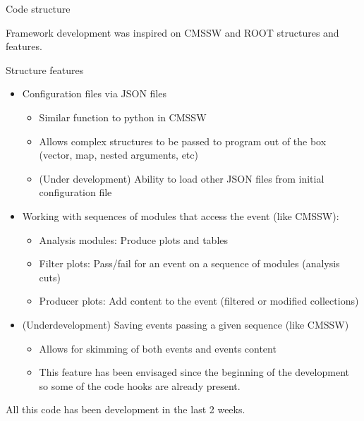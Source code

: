 \documentclass[8pt]{beamer}
\begin{document}
\begin{frame}{Code structure}
 
Framework development was inspired on CMSSW and ROOT structures and features.
 
\begin{block}{Structure features}

\begin{itemize}
  \item Configuration files via JSON files
  \begin{itemize}
    \item Similar function to python in CMSSW
    \item Allows complex structures to be passed to program out of the box (vector, map, nested arguments, etc)
    \item (Under development) Ability to load other JSON files from initial configuration file 
  \end{itemize}
  \item Working with sequences of modules that access the event (like CMSSW):
  \begin{itemize}
    \item Analysis modules: Produce plots and tables
    \item Filter plots: Pass/fail for an event on a sequence of modules (analysis cuts)
    \item Producer plots: Add content to the event (filtered or modified collections)
  \end{itemize}
  \item (Underdevelopment) Saving events passing a given sequence (like CMSSW)
  \begin{itemize}
    \item Allows for skimming of both events and events content
    \item This feature has been envisaged since the beginning of the development so some of the code hooks are already present.
  \end{itemize}
\end{itemize}

\end{block}

\begin{center}
All this code has been development in the last 2 weeks.
\end{center}

\end{frame}
 
\end{document}
